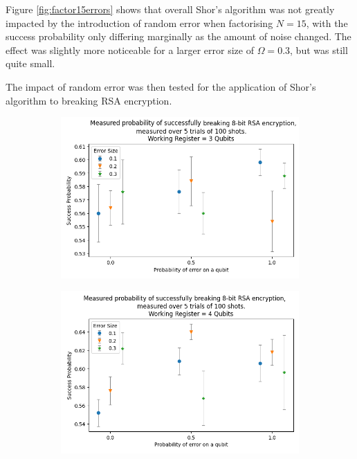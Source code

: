 \documentclass{article}[11pt]
\begin{document}
Figure \ref{fig:factor15errors} shows that overall Shor's algorithm was not greatly impacted by the introduction of random error when factorising $N=15$, with the success probability only differing marginally as the amount of noise changed. The effect was slightly more noticeable for a larger error size of $\Omega=0.3$, but was still quite small.

The impact of random error was then tested for the application of Shor's algorithm to breaking RSA encryption.

\begin{figure}[H]
\centering
\begin{subfigure}[t]{0.7\textwidth}
\centering
\includegraphics[width=\linewidth]{Pictures/RSA Breaking/rsa break errorp test 3 qubits.png}
\end{subfigure}
\begin{subfigure}[t]{0.7\textwidth}
\centering
\includegraphics[width=\linewidth]{Pictures/RSA Breaking/rsa break errorp test 4 qubits.png}

\end{subfigure}
\end{figure}
\end{document}
